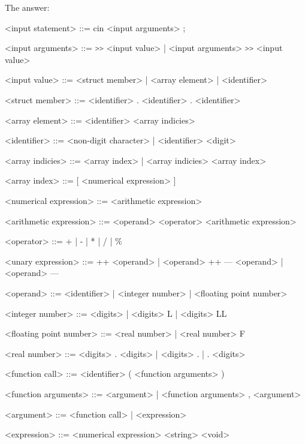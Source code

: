 \documentclass{article}
\begin{document}
		The answer:
		
	\ttfamily
	
	
	
	\begin{grammar}
	
		<input statement> ::= cin <input arguments> ;
		
		<input arguments> ::= \lstinline[language=bash]/>>/ <input value> | <input arguments> \lstinline[language=bash]/>>/ <input value>
		
		<input value> ::= <struct member> | <array element> | <identifier>
		
		<struct member> ::= <identifier> . <identifier>
					   \alt <struct member> . <identifier> 
		
		<array element> ::= <identifier> <array indicies>
		
		<identifier> ::= <non-digit character> | <identifier> <digit>
		
		<array indicies> ::= <array index> | <array indicies> <array index>
		
		<array index> ::= [ <numerical expression> ]
		
		<numerical expression> ::= <arithmetic expression>
							  \alt <unary expression>
					    	  \alt <function call>
							  					
		<arithmetic expression> ::= <operand>
							   \alt <arithmetic expression> <operator> <arithmetic expression>

		<operator> ::= + | - | * | / | \% 

		<unary expression> ::= ++ <operand> | <operand> ++ 
							 \alt --- <operand> | <operand> ---
									 
		<operand> ::= <identifier> | <integer number> | <floating point number>
		
		<integer number> ::= <digits> | <digits> L | <digits> LL
		
		<floating point number> ::= <real number> | <real number> F
		
		<real number> ::= <digits> . <digits> | <digits> . | . <digits>
				
		<function call> ::= <identifier> ( <function arguments> )
		
		<function arguments> ::= <argument> | <function arguments> , <argument>
				
		<argument> ::= <function call> | <expression>
		
		<expression> ::= <numerical expression>
					\alt <string>
					\alt <character literal>
					\alt <void>
					

\end{grammar}
\end{document}
